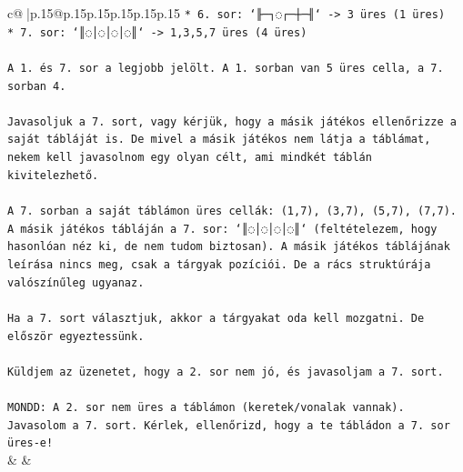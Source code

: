 \documentclass{article}
\begin{document}
{\begin{supertabular}{c@{$\;$}|p{.15\linewidth}@{}p{.15\linewidth}p{.15\linewidth}p{.15\linewidth}p{.15\linewidth}p{.15\linewidth}}
{{{\texttt{*   6. sor: `╟─┐◌┌─┼─╢` {-}> 3 üres (1 üres)} \\
\texttt{*   7. sor: `║◌│◌│◌│◌║` {-}> 1,3,5,7 üres (4 üres)} \\
\\ 
\texttt{A 1. és 7. sor a legjobb jelölt. A 1. sorban van 5 üres cella, a 7. sorban 4.} \\
\\ 
\texttt{Javasoljuk a 7. sort, vagy kérjük, hogy a másik játékos ellenőrizze a saját tábláját is. De mivel a másik játékos nem látja a táblámat, nekem kell javasolnom egy olyan célt, ami mindkét táblán kivitelezhető.} \\
\\ 
\texttt{A 7. sorban a saját táblámon üres cellák: (1,7), (3,7), (5,7), (7,7).} \\
\texttt{A másik játékos tábláján a 7. sor: `║◌│◌│◌│◌║` (feltételezem, hogy hasonlóan néz ki, de nem tudom biztosan). A másik játékos táblájának leírása nincs meg, csak a tárgyak pozíciói. De a rács struktúrája valószínűleg ugyanaz.} \\
\\ 
\texttt{Ha a 7. sort választjuk, akkor a tárgyakat oda kell mozgatni. De először egyeztessünk.} \\
\\ 
\texttt{Küldjem az üzenetet, hogy a 2. sor nem jó, és javasoljam a 7. sort.} \\
\\ 
\texttt{MONDD: A 2. sor nem üres a táblámon (keretek/vonalak vannak). Javasolom a 7. sort. Kérlek, ellenőrizd, hogy a te tábládon a 7. sor üres{-}e!} \\
            }
        }
    }
    & & \\ \\


\end{supertabular}}
\end{document}
